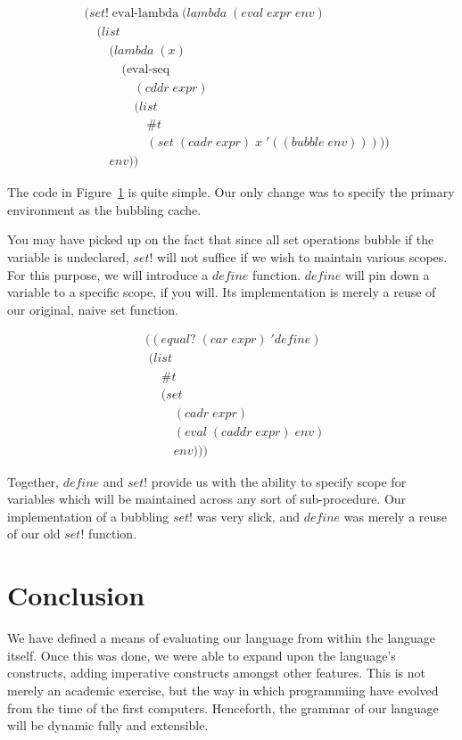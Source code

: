 \begin{figure}[htp]
\footnotesize
\caption{}\label{fig:separateBubbleEnv}
\begin{align*}
& (set! \; \text{eval-lambda} \; (lambda \; (eval \; expr \; env)
\\& \quad (list
\\& \qquad (lambda \; (x) \; 
\\& \qquad \quad (\text{eval-seq} \; 
\\& \qquad \qquad (cddr \; expr) \; 
\\& \qquad \qquad (list
\\& \qquad \qquad \quad \#t
\\& \qquad \qquad \quad (set \; (cadr \; expr) \; x \; '((bubble \; env)))))
\\& \qquad env))
\end{align*}
\end{figure}

The code in Figure~\ref{fig:separateBubbleEnv} is quite simple. Our only change
was to specify the primary environment as the bubbling cache.

You may have picked up on the fact that since all set operations bubble if
the variable is undeclared, $set!$ will not suffice if we wish to maintain
various scopes. For this purpose, we will introduce a $define$ function.
$define$ will pin down a variable to a specific scope, if you will. Its
implementation is merely a reuse of our original, naive set function.

\begin{figure}[htp]
\footnotesize
\caption{}\label{fig:defineDef}
\begin{align*}
& ((equal? \; (car \; expr) \; 'define)
\\& \; (list \; 
\\& \quad \; \#t \; 
\\& \quad \; (set \; 
\\& \qquad \; (cadr \; expr) \; 
\\& \qquad \; (eval \; (caddr \; expr) \; env) \; 
\\& \qquad \; env)))
\end{align*}
\end{figure}

Together, $define$ and $set!$ provide us with the ability to specify scope
for variables which will be maintained across any sort of sub-procedure. Our
implementation of a bubbling $set!$ was very slick, and $define$ was merely
a reuse of our old $set!$ function.

\section{Conclusion}
We have defined a means of evaluating our language from within the language
itself. Once this was done, we were able to expand upon the language's constructs,
adding imperative constructs amongst other features. This is not merely an
academic exercise, but the way in which programmiing have evolved from the time
of the first computers. Henceforth, the grammar of our language will be dynamic
fully and extensible.
